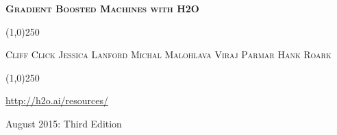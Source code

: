 









\thispagestyle{empty} %


\begin{center}
\textsc{\Large\bf{Gradient Boosted Machines with H2O}}

\bigskip
\line(1,0){250}  %
\\
\bigskip

\textsc{\small{Cliff Click \hspace{10pt} Jessica Lanford \hspace{10pt} Michal Malohlava \hspace{10pt} Viraj Parmar \hspace{10pt} Hank Roark }}

\bigskip
\line(1,0){250}  %

{\url{http://h2o.ai/resources/}}

\bigskip
August 2015: Third Edition 
\\%
\bigskip
\end{center}

\null\vfill
\begin{figure}[!b]
\noindent{}
\end{figure}

\newpage
\restoregeometry

\null\vfill %

\thispagestyle{empty}%

